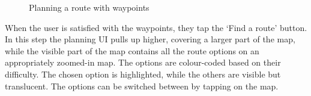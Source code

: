 \begin{figure}[h!]
    \centering
    \hfill
    \hfill
    \caption{Planning a route with waypoints}
    \label{fig:plan-waypoints}
\end{figure}

When the user is satisfied with the waypoints, they tap the `Find a route' button.
In this step the planning UI pulls up higher, covering a larger part of the map, while the visible part of the map contains all the route options on an appropriately zoomed-in map.
The options are colour-coded based on their difficulty.
The chosen option is highlighted, while the others are visible but translucent.
The options can be switched between by tapping on the map.

